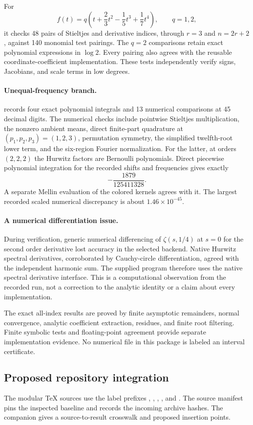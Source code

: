 For
\[
 f(t)=q\left(t+\frac23t^2-\frac15t^3+\frac17t^4\right),
 \qquad q=1,2,
\]
it checks 48 pairs of Stieltjes and derivative indices, through
$r=3$ and $n=2r+2$, against 140 monomial test pairings.
The $q=2$ comparisons retain exact polynomial expressions in
$\log2$. Every pairing also agrees with the reusable
coordinate-coefficient implementation. These tests independently
verify signs, Jacobians, and scale terms in low degrees.

\paragraph{Unequal-frequency branch.}
 records four exact polynomial
integrals and 13 numerical comparisons at 45 decimal digits.
The numerical checks include pointwise Stieltjes multiplication,
the nonzero ambient means, direct finite-part quadrature at
$(p_1,p_2,p_3)=(1,2,3)$, permutation symmetry, the simplified
twelfth-root lower term, and the six-region Fourier normalization.
For the latter, at orders $(2,2,2)$ the Hurwitz factors are
Bernoulli polynomials. Direct piecewise polynomial integration
for the recorded shifts and frequencies gives exactly
\[
 -\frac{1879}{125411328}.
\]
A separate Mellin evaluation of the colored kernels agrees with it.
The largest recorded scaled numerical discrepancy is about
$1.46\times10^{-45}$.

\paragraph{A numerical differentiation issue.}
During verification, generic numerical differencing of
$\zeta(s,1/4)$ at $s=0$ for the second order derivative lost
accuracy in the selected backend. Native Hurwitz spectral
derivatives, corroborated by Cauchy-circle differentiation, agreed
with the independent harmonic sum. The supplied program therefore
uses the native spectral derivative interface. This is a
computational observation from the recorded run, not a correction
to the analytic identity or a claim about every implementation.

The exact all-index results are proved by finite asymptotic
remainders, normal convergence, analytic coefficient extraction,
residues, and finite root filtering. Finite symbolic tests and
floating-point agreement provide separate implementation evidence.
No numerical file in this package is labeled an interval certificate.

\subsection{Proposed repository integration}
The modular TeX sources use the label prefixes ,
, , , and . The source manifest
pins the inspected baseline and records the incoming archive hashes.
The companion  gives a source-to-result
crosswalk and proposed insertion points.

